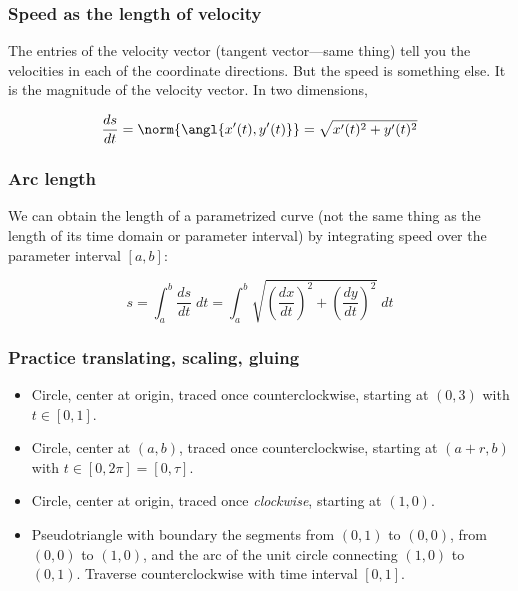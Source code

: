 \documentclass[11pt,ignorenonframetext,aspectratio=169,xcolor={svgnames}]{beamer}
\begin{document}
\begin{frame}\frametitle{Speed as the length of velocity}

The entries of the velocity vector (tangent vector---same thing) tell
you the velocities in each of the coordinate directions. But the speed
is something else. It is the magnitude of the velocity vector. In two
dimensions,

\begin{equation*}
    \frac{ds}{dt} = \norm{\angl{x'(t), y'(t)}} = \sqrt{x'(t)^2 + y'(t)^2}
\end{equation*}

\end{frame}

\begin{frame}\frametitle{Arc length}

We can obtain the length of a parametrized curve (not the same thing as
the length of its time domain or parameter interval) by integrating
speed over the parameter interval $[a,b]$:

\begin{equation*}
    s = \int_a^b \frac{ds}{dt} \; dt = \int_a^b \sqrt{\left( \frac{dx}{dt} \right)^2 + \left( \frac{dy}{dt} \right)^2} \; dt
\end{equation*}

\end{frame}

\begin{frame}\frametitle{Practice translating, scaling, gluing}

\begin{itemize}
\itemsep1pt\parskip0pt
\item
  Circle, center at origin, traced once counterclockwise, starting at
  $(0,3)$ with $t \in [0,1]$.
\item
  Circle, center at $(a,b)$, traced once counterclockwise, starting at
  $(a+r, b)$ with $t \in [0, 2\pi] = [0, \tau]$.
\item
  Circle, center at origin, traced once \emph{clockwise}, starting at
  $(1,0)$.
\item
  Pseudotriangle with boundary the segments from $(0,1)$ to $(0,0)$,
  from $(0,0)$ to $(1,0)$, and the arc of the unit circle connecting
  $(1,0)$ to $(0,1)$. Traverse counterclockwise with time interval
  $[0,1]$.
\end{itemize}

\end{frame}
\end{document}

